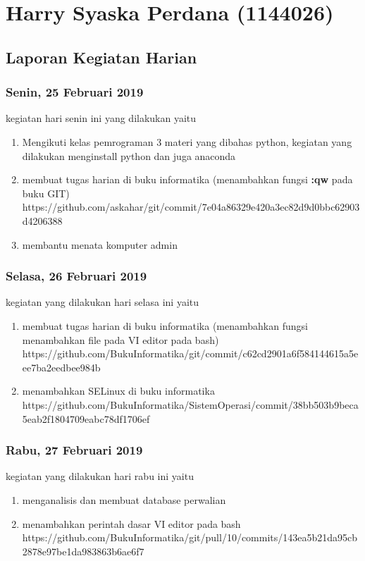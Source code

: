 \chapter{Harry Syaska Perdana (1144026)}
\section{Laporan Kegiatan Harian}
\subsection{Senin, 25 Februari 2019}
kegiatan hari senin ini yang dilakukan yaitu
\begin{enumerate}
\item Mengikuti kelas pemrograman 3 materi yang dibahas python, kegiatan yang dilakukan menginstall python dan juga anaconda
\item membuat tugas harian di buku informatika (menambahkan fungsi \textbf{:qw} pada buku GIT)   
\subitem https://github.com/askahar/git/commit/7e04a86329e420a3ec82d9d0bbc62903d4206388
\item membantu menata komputer admin
\end{enumerate}

\subsection{Selasa, 26 Februari 2019}
kegiatan yang dilakukan hari selasa ini yaitu
\begin{enumerate}
\item  membuat tugas harian di buku informatika (menambahkan fungsi menambahkan file pada VI editor pada bash)
\subitem https://github.com/BukuInformatika/git/commit/c62cd2901a6f584144615a5eee7ba2eedbee984b 
\item menambahkan SELinux di buku informatika 
\subitem https://github.com/BukuInformatika/SistemOperasi/commit/38bb503b9beca5eab2f1804709eabc78df1706ef
\end{enumerate}

\subsection{Rabu, 27 Februari 2019}
kegiatan yang dilakukan hari rabu ini yaitu
\begin{enumerate}
\item menganalisis dan membuat database perwalian 
\item menambahkan perintah dasar VI editor pada bash
\subitem https://github.com/BukuInformatika/git/pull/10/commits/143ea5b21da95cb2878e97be1da983863b6ae6f7
\end{enumerate}